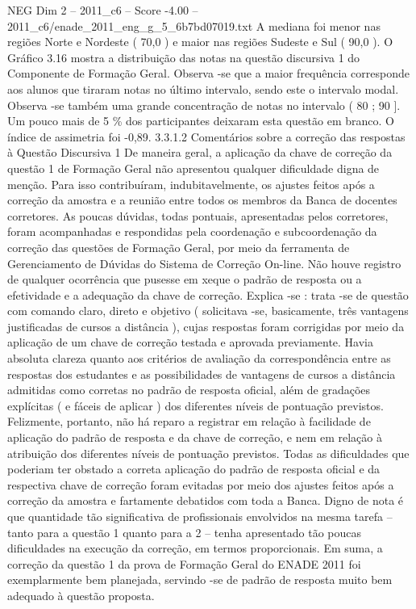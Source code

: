 \begin{textsample}{NEG Dim 2 – 2011\_c6 – Score -4.00 – 2011\_c6/enade\_2011\_eng\_g\_5\_6b7bd07019.txt}
A mediana foi menor nas regiões Norte e Nordeste ( 70,0 ) e maior nas regiões Sudeste e Sul ( 90,0 ).
O Gráfico 3.16 mostra a distribuição das notas na questão discursiva 1 do Componente de Formação Geral.
Observa -se que a maior frequência corresponde aos alunos que tiraram notas no último intervalo, sendo este o intervalo modal.
Observa -se também uma grande concentração de notas no intervalo ( 80 ; 90 ].
Um pouco mais de 5 \% dos participantes deixaram esta questão em branco.
O índice de assimetria foi -0,89. 3.3.1.2 Comentários sobre a correção das respostas à Questão Discursiva 1 De maneira geral, a aplicação da chave de correção da questão 1 de Formação Geral não apresentou qualquer dificuldade digna de menção.
Para isso contribuíram, indubitavelmente, os ajustes feitos após a correção da amostra e a reunião entre todos os membros da Banca de docentes corretores.
As poucas dúvidas, todas pontuais, apresentadas pelos corretores, foram acompanhadas e respondidas pela coordenação e subcoordenação da correção das questões de Formação Geral, por meio da ferramenta de Gerenciamento de Dúvidas do Sistema de Correção On-line.
Não houve registro de qualquer ocorrência que pusesse em xeque o padrão de resposta ou a efetividade e a adequação da chave de correção.
Explica -se : trata -se de questão com comando claro, direto e objetivo ( solicitava -se, basicamente, três vantagens justificadas de cursos a distância ), cujas respostas foram corrigidas por meio da aplicação de um chave de correção testada e aprovada previamente.
Havia absoluta clareza quanto aos critérios de avaliação da correspondência entre as respostas dos estudantes e as possibilidades de vantagens de cursos a distância admitidas como corretas no padrão de resposta oficial, além de gradações explícitas ( e fáceis de aplicar ) dos diferentes níveis de pontuação previstos.
Felizmente, portanto, não há reparo a registrar em relação à facilidade de aplicação do padrão de resposta e da chave de correção, e nem em relação à atribuição dos diferentes níveis de pontuação previstos.
Todas as dificuldades que poderiam ter obstado a correta aplicação do padrão de resposta oficial e da respectiva chave de correção foram evitadas por meio dos ajustes feitos após a correção da amostra e fartamente debatidos com toda a Banca.
Digno de nota é que quantidade tão significativa de profissionais envolvidos na mesma tarefa – tanto para a questão 1 quanto para a 2 – tenha apresentado tão poucas dificuldades na execução da correção, em termos proporcionais.
Em suma, a correção da questão 1 da prova de Formação Geral do ENADE 2011 foi exemplarmente bem planejada, servindo -se de padrão de resposta muito bem adequado à questão proposta.

\end{textsample}
